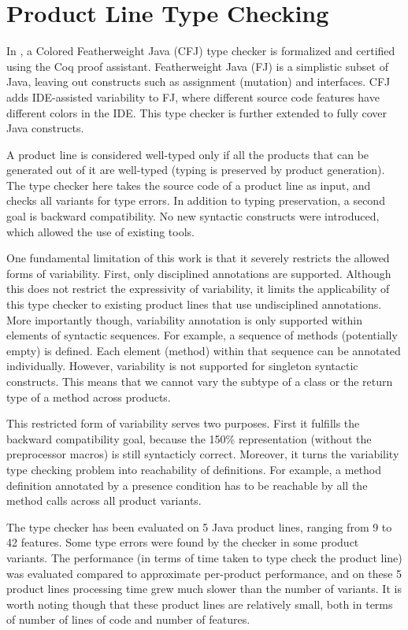 \documentclass[11pt]{article}
\begin{document}
\section{Product Line Type Checking}

In \cite{Kastner:2012}, a Colored Featherweight Java (CFJ) type checker is formalized and certified using the Coq\cite{Bertot:2010} proof assistant. Featherweight Java (FJ) is a simplistic subset of Java, leaving out constructs such as assignment (mutation) and interfaces. CFJ adds IDE-assisted variability to FJ, where different source code features have different colors in the IDE. This type checker is further extended to fully cover Java constructs.

A product line is considered well-typed only if all the products that can be generated out of it are well-typed (typing is preserved by product generation). The type checker here takes the source code of a product line as input, and checks all variants for type errors. In addition to typing preservation, a second goal is backward compatibility. No new syntactic constructs were introduced, which allowed the use of existing tools.

One fundamental limitation of this work is that it severely restricts the allowed forms of variability. First, only disciplined annotations are supported. Although this does not restrict the expressivity of variability, it limits the applicability of this type checker to existing product lines that use undisciplined annotations. More importantly though, variability annotation is only supported within elements of syntactic sequences. For example, a sequence of methods (potentially empty) is defined. Each element (method) within that sequence can be annotated individually. However, variability is not supported for singleton syntactic constructs. This means that we cannot vary the subtype of a class or the return type of a method across products.

This restricted form of variability serves two purposes. First it fulfills the backward compatibility goal, because the 150\% representation (without the preprocessor macros) is still syntacticly correct. Moreover, it turns the variability type checking problem into reachability of definitions. For example, a method definition annotated by a presence condition has to be reachable by all the method calls across all product variants. 
 
The type checker has been evaluated on 5 Java product lines, ranging from 9 to 42 features. Some type errors were found by the checker in some product variants. The performance (in terms of time taken to type check the product line) was evaluated compared to approximate per-product performance, and on these 5 product lines processing time grew much slower than the number of variants. It is worth noting though that these product lines are relatively small, both in terms of number of lines of code and number of features. 
\end{document}
